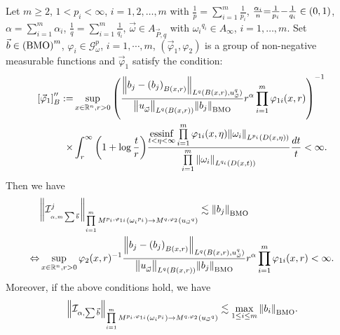 \documentclass[11pt, twoside, leqno]{article}
\begin{document}
\begin{thm}\label{CCFIM2}
	Let $m\geq 2$, $1< p_i<\infty$, $i=1,2,\ldots,m$ with $\frac{1}{p} = \sum\limits_{i = 1}^m {\frac{1}{{{p_i}}}}$, $\frac{{{\alpha _i}}}{n}{\rm{ = }}\frac{1}{{{p_i}}}{\rm{ - }}\frac{1}{{{q_i}}} \in (0,1)$, $\alpha  = \sum\limits_{i = 1}^m {{\alpha _i}}$, $\frac{1}{q} = \sum\limits_{i = 1}^m {\frac{1}{{{q_i}}}}$, $\vec{\omega}\in {A_{\vec P,q}}$ with ${\omega _i}^{{q_i}} \in {A_\infty }$, $i = 1, \ldots ,m$. Set $\vec b \in {\left( {\rm BMO} \right)^m}$, ${\varphi _i} \in \mathcal{G}_\omega ^p$, $i = 1, \cdots ,m$, $({{\vec \varphi }_1},{\varphi _2})$ is a group of non-negative measurable functions and ${{\vec \varphi }_1}$ satisfy the condition:
	\begin{align}
	\left[ {{{\vec \varphi }_1}} \right]_B^{\prime \prime }: =& \mathop {\sup }\limits_{x \in {{\mathbb R^n}},r > 0} {\left( {\frac{{{{\left\| {{b_j} - {{({b_j})}_{B(x,r)}}} \right\|}_{{L^q}{(B(x,r),u_{\vec \omega }^q)}}}}}{{{{\left\| {u_{\vec \omega }^{}} \right\|}_{{L^q}(B(x,r))}}{{\left\| {{b_j}} \right\|}_{\rm BMO}}}}{r^\alpha }\prod\limits_{i = 1}^m {{\varphi _{1i}}(x,r)} } \right)^{-1}}\notag\\
	\times& \int_r^\infty  {{{\left( {1 + \log \frac{t}{r}} \right)}}\frac{{\mathop {{\rm{essinf}}}\limits_{t < \eta  < \infty } \prod\limits_{i = 1}^m {{\varphi _{1i}}(x,\eta ){{\left\| {{\omega _i}} \right\|}_{{L^{{p_i}}}(D(x,\eta ))}}} }}{{\prod\limits_{i = 1}^m {{{\left\| {{\omega _i}} \right\|}_{{L^{{q_i}}}(D(x,t))}}} }}\frac{{dt}}{t}}  < \infty.
	\end{align}
	Then we have
	\begin{align}
	&{\left\| {{\mathcal I}_{_{\alpha ,m\sum {\vec b} }}^j} \right\|_{\prod\limits_{i = 1}^m {{M^{{p_i},{\varphi _{1i}}}}\left( {{\omega _i}^{{p_i}}} \right)}  \to {M^{q,{\varphi _2}}}\left( {{u_{\vec \omega }}^q} \right)}} \lesssim {\left\| {{b_j}} \right\|_{\rm BMO}}\notag\\
	\Leftrightarrow& \mathop {\sup }\limits_{x \in {{\mathbb R^n}},r > 0} {\varphi _2}{(x,r)^{ - 1}}\frac{{{{\left\| {{b_j} - {{({b_j})}_{B(x,r)}}} \right\|}_{{L^q}{(B(x,r),u_{\vec \omega }^q)}}}}}{{{{\left\| {u_{\vec \omega }^{}} \right\|}_{{L^q}(B(x,r))}}{{\left\| {{b_j}} \right\|}_{\rm BMO}}}}{r^\alpha }\prod\limits_{i = 1}^m {{\varphi _{1i}}(x,r)}  < \infty.
	\end{align}
	Moreover, if the above conditions hold, we have
	$${\left\| {{{\mathcal I}_{\alpha ,\sum {\vec b} }}} \right\|_{\prod\limits_{i = 1}^m {{M^{{p_i},{\varphi _{1i}}}}\left( {{\omega _i}^{{p_i}}} \right)}  \to {M^{q,{\varphi _2}}}\left( {{u_{\vec \omega }}^q} \right)}} \lesssim \mathop {\max }\limits_{1 \le i \le m} {\left\| {{b_i}} \right\|_{\rm BMO}}.$$
\end{thm}
\end{document}

